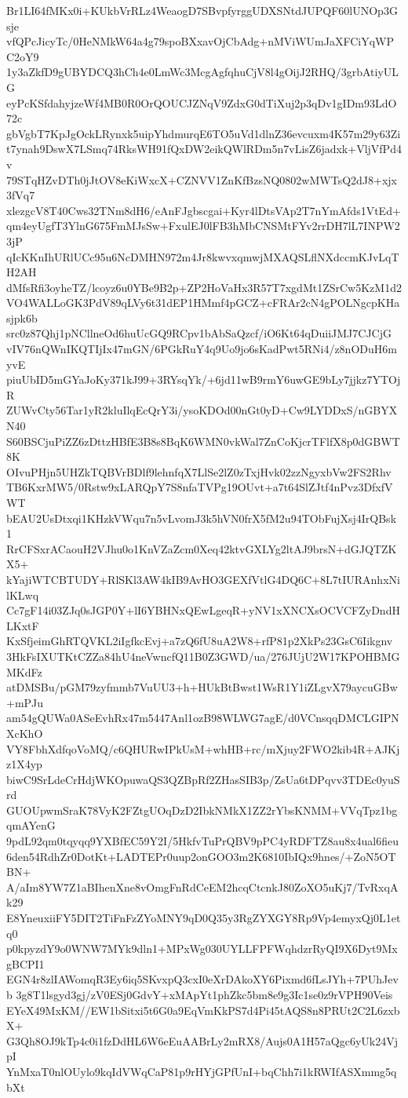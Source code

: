 Br1LI64fMKx0i+KUkbVrRLz4WeaogD7SBvpfyrggUDXSNtdJUPQF60lUNOp3Gsje
vfQPcJicyTc/0HeNMkW64a4g79spoBXxavOjCbAdg+nMViWUmJaXFCiYqWPC2oY9
1y3aZkfD9gUBYDCQ3hCh4e0LmWc3McgAgfqhuCjV8l4gOijJ2RHQ/3grbAtiyULG
eyPcKSfdahyjzeWf4MB0R0OrQOUCJZNqV9ZdxG0dTiXuj2p3qDv1gIDm93LdO72c
gbVgbT7KpJgOckLRynxk5uipYhdmurqE6TO5uVd1dlnZ36evcuxm4K57m29y63Zi
t7ynah9DswX7LSmq74RksWH91fQxDW2eikQWlRDm5n7vLisZ6jadxk+VljVfPd4v
79STqHZvDTh0jJtOV8eKiWxcX+CZNVV1ZnKfBzsNQ0802wMWTsQ2dJ8+xjx3fVq7
xlezgcV8T40Cws32TNm8dH6/eAnFJgbscgai+Kyr4lDtsVAp2T7nYmAfds1VtEd+
qm4eyUgfT3YlnG675FmMJsSw+FxulEJ0lFB3hMbCNSMtFYv2rrDH7lL7INPW23jP
qIcKKnIhURlUCc95u6NcDMHN972m4Jr8kwvxqmwjMXAQSLflNXdccmKJvLqTH2AH
dMfsRfi3oyheTZ/lcoyz6u0YBe9B2p+ZP2HoVaHx3R57T7xgdMt1ZSrCw5KzM1d2
VO4WALLoGK3PdV89qLVy6t31dEP1HMmf4pGCZ+cFRAr2cN4gPOLNgcpKHasjpk6b
src0z87Qhj1pNCllneOd6huUcGQ9RCpv1bAbSaQzcf/iO6Kt64qDuiiJMJ7CJCjG
vIV76nQWnIKQTIjIx47mGN/6PGkRuY4q9Uo9jo6sKadPwt5RNi4/z8nODuH6myvE
piuUbID5mGYaJoKy371kJ99+3RYsqYk/+6jd11wB9rmY6uwGE9bLy7jjkz7YTOjR
ZUWvCty56Tar1yR2kluIlqEcQrY3i/ysoKDOd00nGt0yD+Cw9LYDDxS/nGBYXN40
S60BSCjuPiZZ6zDttzHBfE3B8s8BqK6WMN0vkWal7ZnCoKjcrTFlfX8p0dGBWT8K
OIvuPHjn5UHZkTQBVrBDlf9lehnfqX7LlSe2lZ0zTxjHvk02zzNgyxbVw2FS2Rhv
TB6KxrMW5/0Rstw9xLARQpY7S8nfaTVPg19OUvt+a7t64SlZJtf4nPvz3DfxfVWT
bEAU2UsDtxqi1KHzkVWqu7n5vLvomJ3k5hVN0frX5fM2u94TObFujXsj4IrQBsk1
RrCFSxrACaouH2VJhu0o1KnVZaZcm0Xeq42ktvGXLYg2ltAJ9brsN+dGJQTZKX5+
kYajiWTCBTUDY+RlSKl3AW4kIB9AvHO3GEXfVtlG4DQ6C+8L7tIURAnhxNilKLwq
Cc7gF14i03ZJq0sJGP0Y+lI6YBHNxQEwLgeqR+yNV1xXNCXsOCVCFZyDndHLKxtF
KxSfjeimGhRTQVKL2iIgfkcEvj+a7zQ6fU8uA2W8+rfP81p2XkPs23GsC6Iikgnv
3HkFsIXUTKtCZZa84hU4neVwncfQ11B0Z3GWD/ua/276JUjU2W17KPOHBMGMKdFz
atDMSBu/pGM79zyfmmb7VuUU3+h+HUkBtBwst1WsR1Y1iZLgvX79aycuGBw+mPJu
am54gQUWa0ASeEvhRx47m5447Anl1ozB98WLWG7agE/d0VCnsqqDMCLGIPNXcKhO
VY8FbhXdfqoVoMQ/c6QHURwIPkUsM+whHB+rc/mXjuy2FWO2kib4R+AJKjz1X4yp
biwC9SrLdeCrHdjWKOpuwaQS3QZBpRf2ZHasSIB3p/ZsUa6tDPqvv3TDEc0yuSrd
GUOUpwmSraK78VyK2FZtgUOqDzD2IbkNMkX1ZZ2rYbsKNMM+VVqTpz1bgqmAYenG
9pdL92qm0tqyqq9YXBfEC59Y2I/5HkfvTuPrQBV9pPC4yRDFTZ8au8x4ual6fieu
6den54RdhZr0DotKt+LADTEPr0uup2onGOO3m2K6810IbIQx9hnes/+ZoN5OTBN+
A/aIm8YW7Z1aBIhenXne8vOmgFnRdCeEM2hcqCtcnkJ80ZoXO5uKj7/TvRxqAk29
E8YneuxiiFY5DIT2TiFnFzZYoMNY9qD0Q35y3RgZYXGY8Rp9Vp4emyxQj0L1etq0
p0kpyzdY9o0WNW7MYk9dln1+MPxWg030UYLLFPFWqhdzrRyQI9X6Dyt9MxgBCPI1
EGN4r8zlIAWomqR3Ey6iq5SKvxpQ3cxI0eXrDAkoXY6Pixmd6fLsJYh+7PUhJevb
3g8T1lsgyd3gj/zV0ESj0GdvY+xMApYt1phZkc5bm8e9g3Ic1se0z9rVPH90Veis
EYeX49MxKM//EW1bSitxi5t6G0a9EqVmKkPS7d4Pi45tAQS8n8PRUt2C2L6zxbX+
G3Qh8OJ9kTp4c0i1fzDdHL6W6eEuAABrLy2mRX8/Aujs0A1H57aQgc6yUk24VjpI
YnMxaT0nlOUylo9kqIdVWqCaP81p9rHYjGPfUnI+bqChh7i1kRWIfASXmmg5qbXt
